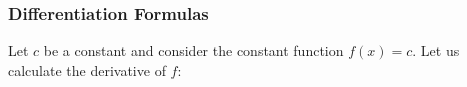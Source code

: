 \begin{frame}
\frametitle{Differentiation Formulas}
Let $c$ be a constant and consider the constant function $f(x) = c$.  Let us calculate the derivative of $f$:
%
%
\end{frame}

